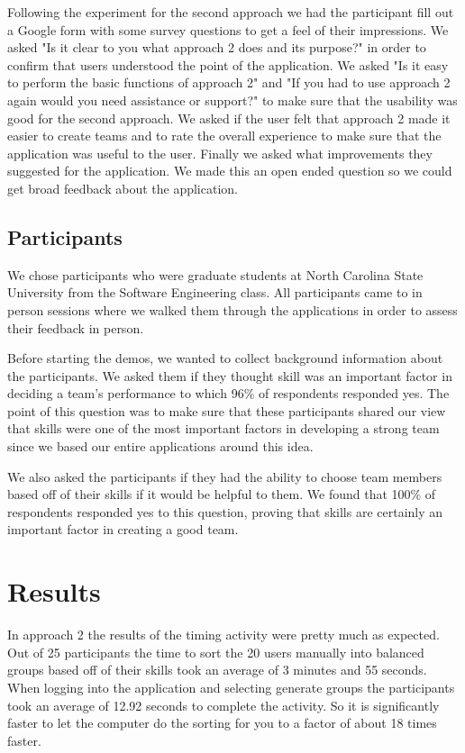\documentclass[conference]{IEEEtran}
\begin{document}
Following the experiment for the second approach we had the participant fill out a Google form with some survey questions to get a feel of their impressions. We asked "Is it clear to you what approach 2 does and its purpose?" in order to confirm that users understood the point of the application. We asked "Is it easy to perform the basic functions of approach 2" and "If you had to use approach 2 again would you need assistance or support?" to make sure that the usability was good for the second approach. We asked if the user felt that approach 2 made it easier to create teams and to rate the overall experience to make sure that the application was useful to the user. Finally we asked what improvements they suggested for the application. We made this an open ended question so we could get broad feedback about the application. 

\subsection{Participants}
We chose participants who were graduate students at North Carolina State University from the Software Engineering class. All participants came to in person sessions where we walked them through the applications in order to assess their feedback in person. 

Before starting the demos, we wanted to collect background information about the participants. We asked them if they thought skill was an important factor in deciding a team's performance to which 96\% of respondents responded yes. The point of this question was to make sure that these participants shared our view that skills were one of the most important factors in developing a strong team since we based our entire applications around this idea. 

We also asked the participants if they had the ability to choose team members based off of their skills if it would be helpful to them. We found that 100\% of respondents responded yes to this question, proving that skills are certainly an important factor in creating a good team. 


\section{Results}
In approach 2 the results of the timing activity were pretty much as expected. Out of 25 participants the time to sort the 20 users manually into balanced groups based off of their skills took an average of 3 minutes and 55 seconds. When logging into the application and selecting generate groups the participants took an average of 12.92 seconds to complete the activity. So it is significantly faster to let the computer do the sorting for you to a factor of about 18 times faster. 
\end{document}
